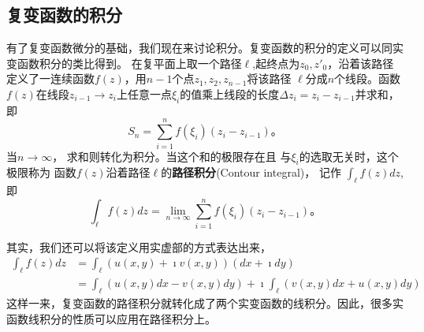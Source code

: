 \subsection[定义和性质]{复变函数的积分}
有了复变函数微分的基础，我们现在来讨论积分。复变函数的积分的定义可以同实变函数积分的类比得到。
在复平面上取一个路径$\ell$,起终点为$z_0,z'_0$，沿着该路径定义了一连续函数$f(z)$，用$n-1$个点$z_1, z_2, z_{n-1}$将该路径
$\ell$分成$n$个线段。函数$f(z)$在线段$z_{i-1}\rightarrow z_{i}$上任意一点$\xi_i$的值乘上线段的长度$\Delta z_i = z_i - z_{i-1}$并求和，即
\begin{equation}
    S_n = \sum_{i=1}^{n} f(\xi_i) (z_{i} - z_{i-1}) \textrm{。}
\end{equation}
当$n\to \infty$， 求和则转化为积分。当这个和的极限存在且
与$\xi_i$的选取无关时，这个极限称为
函数$f(z)$沿着路径$\ell$的\textbf{路径积分}(Contour integral)， 记作
$\int_{\ell} f(z) dz$,即
\begin{equation}
    \int_{\ell} f(z) dz = \lim_{n\to \infty} \sum_{i=1}^{n} f(\xi_i) (z_{i} - z_{i-1}) \textrm{。} 
\end{equation}

其实，我们还可以将该定义用实虚部的方式表达出来，
\begin{align}
    \int_{\ell} f(z) dz  & = \int_{\ell} \left( u(x,y) + \imath v(x,y) \right) (dx + \imath dy) 
    \\
    & = \int_{\ell} \left( u(x,y) dx  -  v(x,y) dy \right) + \imath \int_{\ell}  \left( v(x,y) dx  + u(x,y)dy \right) 
\end{align}
这样一来，复变函数的路径积分就转化成了两个实变函数的线积分。因此，很多实函数线积分的性质可以应用在路径积分上。